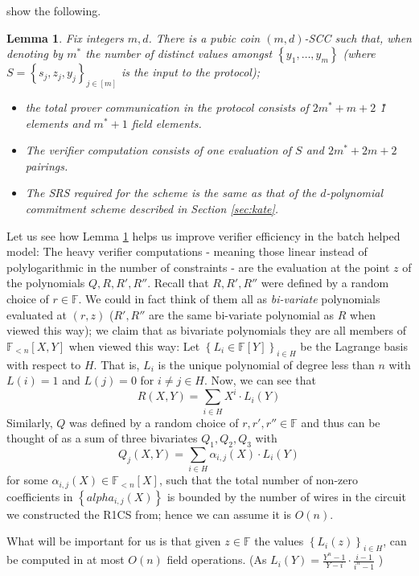 \documentclass[11pt]{article}
\numberwithin{figure}{section} %
\newtheorem{lemma}[thm]{Lemma}
\newcommand{\summ}{\ensuremath{\sum_{i\in H}}\xspace}
\newcommand{\set}[1]{\ensuremath{\left\{#1\right\}}\xspace}
\newcommand{\F}{\ensuremath{\mathbb F}\xspace}
\newcommand{\sett}[2]{\ensuremath{\set{#1}_{#2}}\xspace}
\newcommand{\polysofdeg}[1]{\ensuremath{\F_{< #1}[X]}\xspace}
\newcommand{\bivar}[1]{\ensuremath{\F_{< #1}[X,Y]}\xspace}
\begin{document}
\cite{sonic} show the following.
\begin{lemma}\label{lem:sonicSCC}
 Fix integers $m,d$.
 There is a pubic coin $(m,d)$-SCC such that,
 when denoting by $m^*$ the number of distinct values amongst $\set{y_1,\ldots,y_m}$ (where $S=\sett{s_j,z_j,y_j}{j\in [m]}$ is the input to the protocol);
 \begin{itemize}
  \item the total prover communication in the protocol consists of $2m^* + m+2$ \G1 elements and $m^*+1$ field elements. 
  \item The verifier computation consists of one evaluation of $S$ and $2m^* +2m+2$ pairings.
\item The SRS required for the scheme is the same as that of the $d$-polynomial commitment scheme described in Section \ref{sec:kate}.
  \end{itemize}

\end{lemma}


Let us see how Lemma \ref{lem:sonicSCC} helps us improve verifier efficiency in the batch helped model:
The heavy verifier computations - meaning those linear instead of polylogarithmic in the number of constraints - are the evaluation at the point $z$ of the polynomials $Q,R,R',R''$.
Recall that $R,R',R''$ were defined by a random choice of $r\in \F$.
We could in fact think of them all as \emph{bi-variate} polynomials evaluated at $(r,z)$ ($R',R''$ are the same bi-variate polynomial as $R$ when viewed this way); we claim that as bivariate polynomials they are all members of \bivar{n} when viewed this way:
Let \sett{L_i \in \F[Y]}{i\in H} be the Lagrange basis with respect to $H$.
That is, $L_i$ is the unique polynomial of degree less than $n$ with 
$L(i)=1$ and $L(j)=0$ for $i\neq j \in H$.
Now, we can see that 
\[R(X,Y)=\summ X^i\cdot L_i(Y)\]
Similarly, $Q$ was defined by a random choice of $r,r',r''\in \F$ and thus can be thought of as a sum of three bivariates $Q_1,Q_2,Q_3$
with
\[Q_j(X,Y) = \summ \alpha_{i,j}(X)\cdot L_i(Y)\]
for some $\alpha_{i,j}(X)\in \polysofdeg{n}$, such that the total number of non-zero coefficients in \set{alpha_{i,j}(X)} is bounded by the number of wires in the circuit we constructed the R1CS from; hence we can assume it is $O(n)$.

What will be important for us is that given $z\in \F$ the values \sett{L_i(z)}{i\in H},
can be computed in at most $O(n)$ field operations. (As $L_i(Y)=\frac{Y^n-1}{Y-i}\cdot\frac{i-1}{i^n-1}$ )
\end{document}
